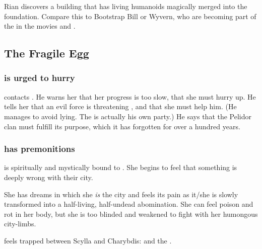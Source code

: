 Rian discovers a building that has living humanoids magically merged into the foundation. Compare this to Bootstrap Bill or Wyvern, who are becoming part of the  in the movies \cite{Movie:PiratesoftheCaribbean:II} and \cite{Movie:PiratesoftheCaribbean:III}. 









\subsection{The Fragile Egg}





\subsubsection{\Tiroco{} is urged to hurry}
\Psyrex{} contacts \Tiroco. 
He warns her that her progress is too slow, that she must hurry up. 
He tells her that an evil force is threatening \Malcur, and that she must help him. 
(He manages to avoid lying. The  is actually his own party.) 
He says that the Pelidor clan must fulfill its purpose, which it has forgotten for over a hundred years. 





\subsubsection{\Tiroco{} has premonitions}
\Tiroco{} is spiritually and mystically bound to \Malcur. 
She begins to feel that something is deeply wrong with their city. 

She has dreams in which she \emph{is} the city and feels its pain as it/she is slowly transformed into a half-living, half-undead abomination. 
She can feel poison and rot in her body, but she is too blinded and weakened to fight with her humongous city-limbs.

\Tiroco{} feels trapped between Scylla and Charybdis: \Nithdornazsh{} and the \noggyaleth. 

